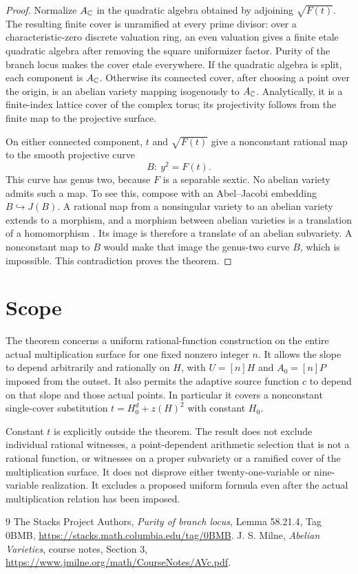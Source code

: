 \documentclass[11pt,a4paper]{article}
\begin{document}
\begin{proof}
Normalize $A_{\mathbb C}$ in the quadratic algebra obtained by adjoining
$\sqrt{F(t)}$. The resulting finite cover is unramified at every
prime divisor: over a characteristic-zero discrete valuation ring,
an even valuation gives a finite etale quadratic algebra after
removing the square uniformizer factor. Purity of the branch locus
\cite[Tag 0BMB]{Stacks} makes the cover etale everywhere. If the
quadratic algebra is split, each component is $A_{\mathbb C}$. Otherwise
its connected cover, after choosing a point over the origin, is
an abelian variety mapping isogenously to $A_{\mathbb C}$. Analytically,
it is a finite-index lattice cover of the complex torus; its
projectivity follows from the finite map to the projective surface.

On either connected component, $t$ and $\sqrt{F(t)}$ give a
nonconstant rational map to the smooth projective curve
\[
                              B:\ y^2=F(t).
\]
This curve has genus two, because $F$ is a separable sextic.
No abelian variety admits such a map. To see this, compose with
an Abel--Jacobi embedding $B\hookrightarrow J(B)$. A rational map
from a nonsingular variety to an abelian variety extends to a
morphism, and a morphism between abelian varieties is a translation
of a homomorphism \cite[Theorem 3.2 and Corollary 3.7]{Milne}. Its image is therefore a
translate of an abelian subvariety. A nonconstant map to $B$ would
make that image the genus-two curve $B$, which is impossible.
This contradiction proves the theorem.
\end{proof}

\section*{Scope}

The theorem concerns a uniform rational-function construction on the
entire actual multiplication surface for one fixed nonzero integer
$n$. It allows the slope to depend arbitrarily and rationally on
$H$, with $U=[n]H$ and $A_0=[n]P$ imposed from the outset.
It also permits the adaptive source function $c$ to depend on that
slope and those actual points. In particular it covers a nonconstant
single-cover substitution $t=H_0^d+z(H)^2$ with constant $H_0$.

Constant $t$ is explicitly outside the theorem. The result does not
exclude individual rational witnesses, a point-dependent arithmetic
selection that is not a rational function, or witnesses on a proper
subvariety or a ramified cover of the multiplication surface. It
does not disprove either twenty-one-variable or nine-variable
realization. It excludes a proposed uniform formula even after the
actual multiplication relation has been imposed.

\begin{thebibliography}{9}
The Stacks Project Authors,
\emph{Purity of branch locus}, Lemma 58.21.4, Tag 0BMB,
\url{https://stacks.math.columbia.edu/tag/0BMB}.
J. S. Milne, \emph{Abelian Varieties}, course notes,
Section 3, \url{https://www.jmilne.org/math/CourseNotes/AVc.pdf}.
\end{thebibliography}
\end{document}
